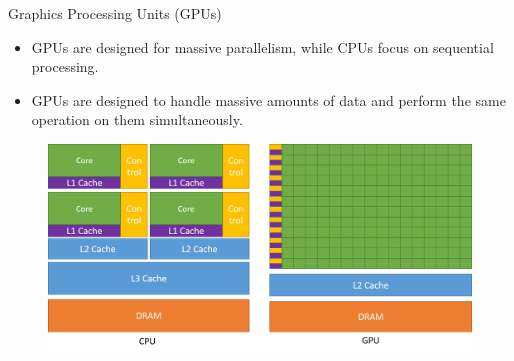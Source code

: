 \begin{frame}{Graphics Processing Units (GPUs)}
	\begin{block}{}
		\begin{itemize}
			\item GPUs are designed for massive parallelism, while CPUs focus on sequential processing.
            \item GPUs are designed to handle massive amounts of data and perform the same operation on them simultaneously.
		\end{itemize}
        \begin{center}
            \begin{figure}[H]
                \includegraphics[scale=0.3]{figures/gpu-devotes-more-transistors-to-data-processing.png}
            \end{figure}
        \end{center}
	\end{block}
\end{frame}

